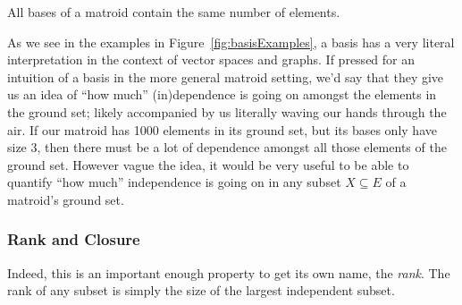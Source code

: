 \documentclass[12pt,oneside]{../../sfsuthesis}
\begin{document}
\begin{proposition}\th\label{thm:basesSameSize}
    All bases of a matroid contain the same number of elements.
\end{proposition}




As we see in the examples in Figure~\ref{fig:basisExamples}, a basis has a very literal interpretation in the context of vector spaces and graphs.
If pressed for an intuition of a basis in the more general matroid setting, we'd say that they give us an idea of ``how much'' (in)dependence is going on amongst the elements in the ground set; likely accompanied by us literally waving our hands through the air.
If our matroid has 1000 elements in its ground set, but its bases only have size 3, then there must be a lot of dependence amongst all those elements of the ground set.
However vague the idea, it would be very useful to be able to quantify ``how much'' independence is going on in any subset \( X \subseteq E \) of a matroid's ground set.

\subsubsection{Rank and Closure}

Indeed, this is an important enough property to get its own name, the \emph{rank}.
The rank of any subset is simply the size of the largest independent subset.
\end{document}
